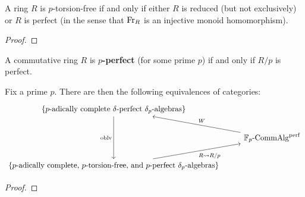             \begin{lemma} \label{lemma: a_criterion_for_p_torsion_freeness}
                \cite[Lemma 2.28]{bhatt_scholze_prisms} A ring $R$ is $p$-torsion-free if and only if either $R$ is reduced (but not exclusively) or $R$ is perfect (in the sense that $\mathrm{Fr}_R$ is an injective monoid homomorphism).
            \end{lemma}
                \begin{proof}
                    
                \end{proof}
            \begin{definition} \label{def: p_perfect_rings}
                A commutative ring $R$ is \textbf{$p$-perfect} (for some prime $p$) if and only if $R/p$ is perfect.
            \end{definition}
            \begin{proposition}
                Fix a prime $p$. There are then the following equivalences of categories:
                    $$
                        \begin{tikzcd}
                        	{\left\{\text{$p$-adically complete $\delta$-perfect $\delta_p$-algebras}\right\}} \\
                        	& {\F_p\-\Comm\Alg^{\perf}} \\
                        	{\left\{\text{$p$-adically complete, $p$-torsion-free, and $p$-perfect $\delta_p$-algebras}\right\}}
                        	\arrow["\Witt"', from=2-2, to=1-1]
                        	\arrow["{R \mapsto R/p}"', from=3-1, to=2-2]
                        	\arrow["\oblv"', from=1-1, to=3-1]
                        \end{tikzcd}
                    $$
            \end{proposition}
                \begin{proof}
                    
                \end{proof}
        

